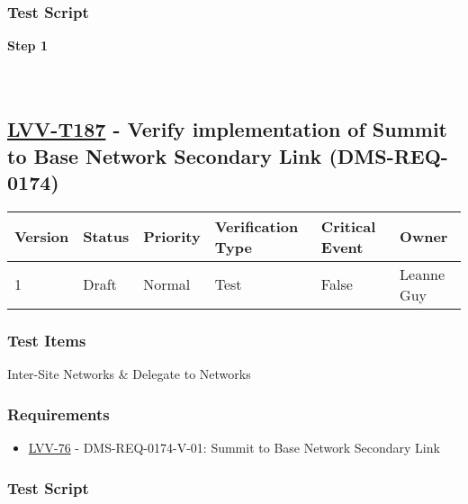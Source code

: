 \hypertarget{test-script-86}{%
\subsubsection{Test Script}\label{test-script-86}}

\textbf{Step 1}\\
~\\
~\\

\hypertarget{lvv-t187---verify-implementation-of-summit-to-base-network-secondary-link-dms-req-0174}{%
\subsection{\texorpdfstring{\href{https://jira.lsstcorp.org/secure/Tests.jspa\#/testCase/LVV-T187}{LVV-T187}
- Verify implementation of Summit to Base Network Secondary Link
(DMS-REQ-0174)}{LVV-T187 - Verify implementation of Summit to Base Network Secondary Link (DMS-REQ-0174)}}\label{lvv-t187---verify-implementation-of-summit-to-base-network-secondary-link-dms-req-0174}}

\begin{longtable}[]{@{}llllll@{}}
\toprule
Version & Status & Priority & Verification Type & Critical Event &
Owner\tabularnewline
\midrule
\endhead
1 & Draft & Normal & Test & False & Leanne Guy\tabularnewline
\bottomrule
\end{longtable}

\hypertarget{test-items-87}{%
\subsubsection{Test Items}\label{test-items-87}}

Inter-Site Networks \& Delegate to Networks

\hypertarget{requirements-87}{%
\subsubsection{Requirements}\label{requirements-87}}

\begin{itemize}
\tightlist
\item
  \href{https://jira.lsstcorp.org/browse/LVV-76}{LVV-76} -
  DMS-REQ-0174-V-01: Summit to Base Network Secondary Link
\end{itemize}

\hypertarget{test-script-87}{%
\subsubsection{Test Script}\label{test-script-87}}

